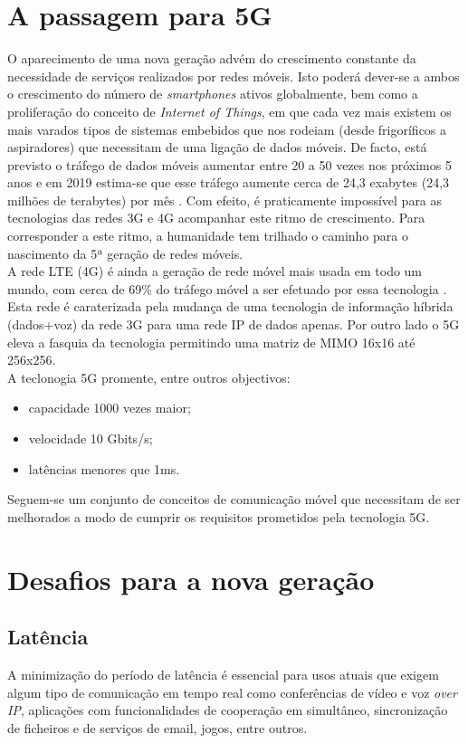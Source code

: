 \documentclass{llncs}
\begin{document}
\section{A passagem para 5G}
\hspace*{1.5em}O aparecimento de uma nova geração advém do crescimento constante da necessidade de serviços realizados por redes móveis. Isto poderá dever-se a ambos o crescimento do número de \textit{smartphones} ativos globalmente, bem como a proliferação do conceito de \textit{Internet of Things}, em que cada vez mais existem os mais varados tipos de sistemas embebidos que nos rodeiam (desde frigoríficos a aspiradores) que necessitam de uma ligação de dados móveis. De facto, está previsto o tráfego de dados móveis aumentar entre 20 a 50 vezes nos próximos 5 anos e em 2019 estima-se que esse tráfego aumente cerca de 24,3 exabytes (24,3 milhões de terabytes) por mês \cite{Fei}. Com efeito, é praticamente impossível para as tecnologias das redes 3G e 4G acompanhar este ritmo de crescimento. Para corresponder a este ritmo, a humanidade tem trilhado o caminho para o nascimento da 5ª geração de redes móveis.
\\
\hspace*{1.5em}A rede LTE (4G) é ainda a geração de rede móvel mais usada em todo um mundo, com cerca de 69\% do tráfego móvel a ser efetuado por essa tecnologia \cite{cisco}. Esta rede é caraterizada pela mudança de uma tecnologia de informação híbrida (dados+voz) da rede 3G para uma rede IP de dados apenas.
Por outro lado o 5G eleva a fasquia da tecnologia permitindo uma matriz de MIMO 16x16 até 256x256. \\
A teclonogia 5G promente, entre outros objectivos:
\begin{itemize}
    \item capacidade 1000 vezes maior;
    \item velocidade 10 Gbits/s;
    \item latências menores que 1ms.
\end{itemize}

Seguem-se um conjunto de conceitos de comunicação móvel que necessitam de ser melhorados a modo de cumprir os requisitos prometidos pela tecnologia 5G.

\section{Desafios para a nova geração}

\subsection{Latência}
A minimização do período de latência é essencial para usos atuais que exigem algum tipo de comunicação em tempo real como conferências de vídeo e voz \textit{over IP}, aplicações com funcionalidades de cooperação em simultâneo, sincronização de ficheiros e de serviços de email, jogos, entre outros.
\end{document}
